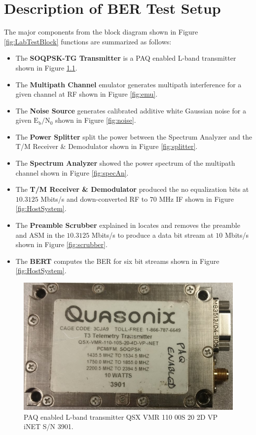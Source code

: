 \chapter{Description of BER Test Setup}
\label{sec:appendxi_setup}
The major components from the block diagram shown in Figure \ref{fig:LabTestBlock} functions are summarized as follows:
\begin{itemize}
\item The \textbf{SOQPSK-TG Transmitter} is a PAQ enabled L-band transmitter shown in Figure \ref{fig:trans}.
\item The \textbf{Multipath Channel} emulator generates multipath interference for a given channel at RF shown in Figure \ref{fig:emu}.
\item The \textbf{Noise Source} generates calibrated additive white Gaussian noise for a given $\text{E}_\text{b}/\text{N}_\text{0}$ shown in Figure \ref{fig:noise}.
\item The \textbf{Power Splitter} split the power between the Spectrum Analyzer and the T/M Receiver \& Demodulator  shown in Figure \ref{fig:splitter}.
\item The \textbf{Spectrum Analyzer} showed the power spectrum of the multipath channel shown in Figure \ref{fig:specAn}.
\item The \textbf{T/M Receiver \& Demodulator} produced the no equalization bits at $10.3125$ Mbits/s and down-converted RF to $70$ MHz IF  shown in Figure \ref{fig:HostSystem}.
\item The \textbf{Preamble Scrubber} explained in \cite{hog2016} locates and removes the preamble and ASM in the $10.3125$ Mbits/s to produce a data bit stream at $10$ Mbits/s shown in Figure \ref{fig:scrubber}.
\item The \textbf{BERT} computes the BER for six bit streams shown in Figure \ref{fig:HostSystem}.
\end{itemize}
\clearpage
\begin{figure}
	\centering\includegraphics[scale=0.5]{figures/eq_GPUimplementation/trans.jpg}
	\caption{PAQ enabled L-band transmitter QSX VMR 110 00S 20 2D VP iNET S/N 3901.}
	\label{fig:trans}
\end{figure}
